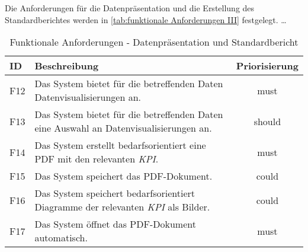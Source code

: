 Die Anforderungen für die Datenpräsentation und die Erstellung des Standardberichtes werden in \autoref{tab:funktionale Anforderungen III} festgelegt.
\dots
\begingroup
\setlength{\tabcolsep}{10pt} %
\renewcommand{\arraystretch}{1.0} 
\begin{table}[H]
    \centering
    \begin{adjustbox}{max width=\textwidth}
    \begin{tabular}{lp{15cm}c}
       \toprule
       \textbf{ID}          & \textbf{Beschreibung} &\textbf{Priorisierung}\\
       \midrule
        F12                              &Das System bietet für die betreffenden Daten Datenvisualisierungen an. & must\\
        F13                              &Das System bietet für die betreffenden Daten eine Auswahl an Datenvisualisierungen an. & should\\
        F14                              &Das System erstellt bedarfsorientiert eine PDF mit den relevanten \textit{\acrshort{KPI}}. & must\\
        F15                              &Das System speichert das PDF-Dokument. & could\\
        F16                              &Das System speichert bedarfsorientiert Diagramme der relevanten \textit{\acrshort{KPI}} als Bilder. & could\\
        F17                              &Das System öffnet das PDF-Dokument automatisch. & must\\
        \bottomrule
    \end{tabular}
    \end{adjustbox}
    \caption{%
        Funktionale Anforderungen - Datenpräsentation und Standardbericht
    }
    \label{tab:funktionale Anforderungen III}
    \end{table}
\endgroup



